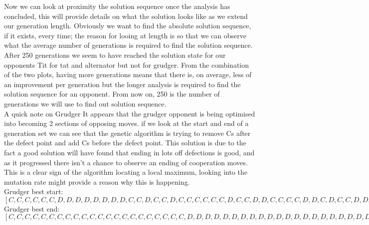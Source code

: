 Now we can look at proximity the solution sequence once the analysis has concluded, this will provide details on what the solution looks like as we extend our generation length. Obviously we want to find the absolute solution sequence, if it exists, every time; the reason for looing at length is so that we can observe what the average number of generations is required to find the solution sequence.\\
    
    
After 250 generations we seem to have reached the solution state for our opponents Tit for tat and alternator but not for grudger. From the combination of the two plots, having more generations means that there is, on average, less of an improvement per generation but the longer analysis is required to find the solution sequence for an opponent. From now on, 250 is the number of generations we will use to find out solution sequence.\\ 

A quick note on Grudger It appears that the grudger opponent is being optimised into becoming 2 sections of opposing moves. if we look at the start and end of a generation set we can see that the genetic algorithm is trying to remove Cs after the defect point and add Cs before the defect point. This solution is due to the fact a good solution will have found that ending in lots off defections is good, and as it progressed there isn't a chance to observe an ending of cooperation moves. This is a clear sign of the algorithm locating a local maximum, looking into the mutation rate might provide a reason why this is happening.\\
    
Grudger best start:\([C, C, C, C, C, C, D, D, D, D, D, D, D, D, C, C, D, C, C, D, C, C, C, C, C, C, D, C, C, D, D, C, C, C, C, D, D, C, D, C, C, D, D, D, D, D, D, D, D, D, D, C, D, C, D, D, D, C, D, D, D, C, D, C, D, C, C, D, D, C, D, C, D, D, C, C, C, D, D, D, D, D, C, C, D, D, C, C, D, C, D, D, C, D, C, C, C, C, D, C, C, D, C, D, C, C, D, D, D, C, D, C, C, D, D, C, D, D, D, D, D, D, D, C, C, C, D, D, C, D, D, C, C, C, D, C, D, D, D, D, D, C, D, C, D, C, D, C, D, C, D, C, C, C, C, D, C, D, C, D, D, D, D, C, C, D, C, D, D, D, C, D, C, C, D, D, D, C, C, C, C, D, C, D, D, D, C, C, D, D, D, D, C, C, D, C, C, D, D, D]\)\\ 

Grudger best end:\([C, C, C, C, C, C, C, C, C, C, C, C, C, C, C, C, C, C, C, C, C, C, D, D, D, D, D, D, D, D, D, D, D, D, D, D, D, D, D, D, D, D, D, D, D, D, D, D, D, D, D, D, D, D, D, D, D, D, D, D, D, D, D, D, D, D, D, D, D, D, D, D, D, D, D, D, D, D, D, D, D, D, D, D, D, D, D, D, D, D, D, D, D, D, D, D, D, D, D, D, D, D, D, D, D, D, D, D, D, D, D, D, D, D, D, D, D, D, D, D, D, D, D, D, D, D, D, D, D, D, D, D, D, D, D, D, D, D, D, D, D, D, D, D, D, D, D, D, D, D, D, D, D, D, D, D, D, D, D, D, D, D, D, D, D, D, D, D, D, D, D, D, D, D, D, D, D, D, D, D, D, D, D, D, D, D, D, D, D, D, D, D, D, D, D, D, D, D, D, D]\)\\
    

